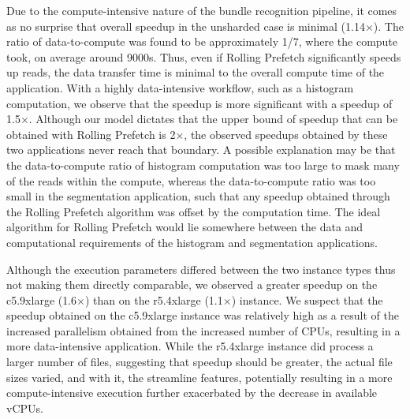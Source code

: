 \documentclass[conference]{IEEEtran}
\begin{document}
Due to the compute-intensive nature of the bundle recognition pipeline, it comes as no
surprise that overall speedup in the unsharded case is minimal (1.14$\times$). The ratio of data-to-compute was found to be approximately 1/7, where the compute took, on average around 9000s. Thus, even if Rolling Prefetch significantly speeds up reads, the data transfer time is
minimal to the overall compute time of the application. With a highly data-intensive
workflow, such as a histogram computation, we observe that the speedup is more
significant with a speedup of 1.5$\times$. Although our model dictates that the upper bound
of speedup that can be obtained with Rolling Prefetch is 2$\times$, the observed speedups
obtained by these two applications never reach that boundary. A possible explanation may be that the data-to-compute ratio of histogram computation was too large to mask many of
the reads within the compute, whereas the data-to-compute ratio was too small in the segmentation application, such that any speedup obtained
through the Rolling Prefetch algorithm was offset by the computation time. The ideal
algorithm for Rolling Prefetch would lie somewhere between the data and computational
requirements of the histogram and segmentation applications.

Although the execution parameters differed between the two instance types thus not
making them directly comparable, we observed a greater speedup on the c5.9xlarge
(1.6$\times$) than on the r5.4xlarge (1.1$\times$) instance. We suspect that the speedup obtained
on the c5.9xlarge instance was relatively high as a result of the increased parallelism
obtained from the increased number of CPUs, resulting in a more data-intensive application. While the r5.4xlarge instance did process a larger number of files, 
suggesting that speedup should be greater, the actual file sizes varied, and with
it, the streamline features, potentially resulting in a more compute-intensive
execution further exacerbated by the decrease in available vCPUs. 


\end{document}
